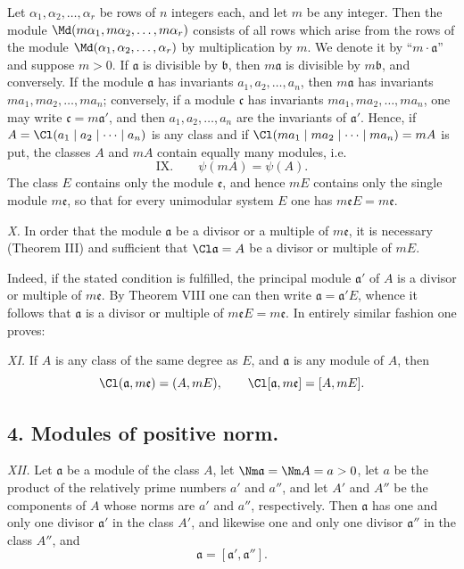 Let $\alpha_1,\alpha_2,\ldots,\alpha_r$ be rows of $n$ integers each, and let $m$ be any integer. Then the module $\Md(m\alpha_1,m\alpha_2,\ldots,m\alpha_r)$ consists of all rows which arise from the rows of the module $\Md(\alpha_1,\alpha_2,\ldots,\alpha_r)$ by multiplication by $m$. We denote it by ``$m\cdot\mathfrak a$'' and suppose $m>0$. If $\mathfrak a$ is divisible by $\mathfrak b$, then $m\mathfrak a$ is divisible by $m\mathfrak b$, and conversely. If the module $\mathfrak a$ has invariants $a_1,a_2,\ldots,a_n$, then $m\mathfrak a$ has invariants $ma_1,ma_2,\ldots,ma_n$; conversely, if a module $\mathfrak c$ has invariants $ma_1,ma_2,\ldots,ma_n$, one may write $\mathfrak c=m\mathfrak a'$, and then $a_1,a_2,\ldots,a_n$ are the invariants of $\mathfrak a'$. Hence, if $A=\Cl(a_1\mid a_2\mid\cdots\mid a_n)$ is any class and if $\Cl(ma_1\mid ma_2\mid\cdots\mid ma_n)=mA$ is put, the classes $A$ and $mA$ contain equally many modules, i.e.
\[
\text{IX.}\qquad \psi(mA)=\psi(A).
\]
The class $E$ contains only the module $\mathfrak e$, and hence $mE$ contains only the single module $m\mathfrak e$, so that for every unimodular system $E$ one has $m\mathfrak eE=m\mathfrak e$.

\emph{X.} In order that the module $\mathfrak a$ be a divisor or a multiple of $m\mathfrak e$, it is necessary (Theorem III) and sufficient that $\Cl\mathfrak a=A$ be a divisor or multiple of $mE$.

Indeed, if the stated condition is fulfilled, the principal module $\mathfrak a'$ of $A$ is a divisor or multiple of $m\mathfrak e$. By Theorem VIII one can then write $\mathfrak a=\mathfrak a'E$, whence it follows that $\mathfrak a$ is a divisor or multiple of $m\mathfrak eE=m\mathfrak e$. In entirely similar fashion one proves:

\emph{XI.} If $A$ is any class of the same degree as $E$, and $\mathfrak a$ is any module of $A$, then
\[
 \Cl(\mathfrak a,m\mathfrak e)=(A,mE),
 \qquad
 \Cl[\mathfrak a,m\mathfrak e]=[A,mE].
\]

\subsection*{4. Modules of positive norm.}

\emph{XII.} Let $\mathfrak a$ be a module of the class $A$, let $\Nm\mathfrak a=\Nm A=a>0$, let $a$ be the product of the relatively prime numbers $a'$ and $a''$, and let $A'$ and $A''$ be the components of $A$ whose norms are $a'$ and $a''$, respectively. Then $\mathfrak a$ has one and only one divisor $\mathfrak a'$ in the class $A'$, and likewise one and only one divisor $\mathfrak a''$ in the class $A''$, and
\[
 \mathfrak a=[\mathfrak a',\mathfrak a''].
\]

